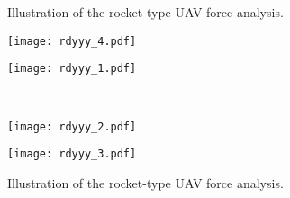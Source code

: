 \begin{figure}[H]
    \centering
    \!
    \!
    \caption{Illustration of the rocket-type UAV force analysis.}
    \label{fig:6Dof_Rocket_Dynamics}
\end{figure}

\begin{figure}[H]
    \centering
    \begin{minipage}{0.3\linewidth}
        \texttt{[image: rdyyy\_4.pdf]}
    \end{minipage}
    \begin{minipage}{0.3\linewidth}
        \texttt{[image: rdyyy\_1.pdf]}
    \end{minipage} \\
    \begin{minipage}{0.3\linewidth}
        \texttt{[image: rdyyy\_2.pdf]}
    \end{minipage}
    \begin{minipage}{0.3\linewidth}
        \texttt{[image: rdyyy\_3.pdf]}
    \end{minipage}
    \caption{Illustration of the rocket-type UAV force analysis.}
    \label{fig:6Dof_Rocket_Dynamics2}
\end{figure}
